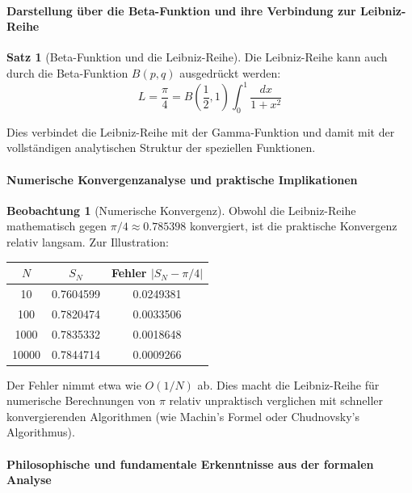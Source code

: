 \documentclass[a4paper, 12pt, twoside, openright]{report}
\theoremstyle{definition}
\newtheorem{beobachtung}{Beobachtung}
\theoremstyle{definition}
\newtheorem{satz}{Satz}[chapter]
\begin{document}
\paragraph{Darstellung über die Beta-Funktion und ihre Verbindung zur Leibniz-Reihe}

\begin{satz}[Beta-Funktion und die Leibniz-Reihe]
Die Leibniz-Reihe kann auch durch die Beta-Funktion $B(p,q)$ ausgedrückt werden:
\begin{equation}
L = \frac{\pi}{4} = B\left(\frac{1}{2}, 1\right) \int_0^1 \frac{dx}{1+x^2}
\end{equation}

Dies verbindet die Leibniz-Reihe mit der Gamma-Funktion und damit mit der vollständigen analytischen Struktur der speziellen Funktionen.
\end{satz}

\paragraph{Numerische Konvergenzanalyse und praktische Implikationen}

\begin{beobachtung}[Numerische Konvergenz]
Obwohl die Leibniz-Reihe mathematisch gegen $\pi/4 \approx 0.785398$ konvergiert, ist die praktische Konvergenz relativ langsam. Zur Illustration:

\begin{center}
\begin{tabular}{c|c|c}
$N$ & $S_N$ & Fehler $|S_N - \pi/4|$ \\
\hline
10 & 0.7604599 & 0.0249381 \\
100 & 0.7820474 & 0.0033506 \\
1000 & 0.7835332 & 0.0018648 \\
10000 & 0.7844714 & 0.0009266 \\
\end{tabular}
\end{center}

Der Fehler nimmt etwa wie $O(1/N)$ ab. Dies macht die Leibniz-Reihe für numerische Berechnungen von $\pi$ relativ unpraktisch verglichen mit schneller konvergierenden Algorithmen (wie Machin's Formel oder Chudnovsky's Algorithmus).
\end{beobachtung}

\paragraph{Philosophische und fundamentale Erkenntnisse aus der formalen Analyse}
\end{document}
